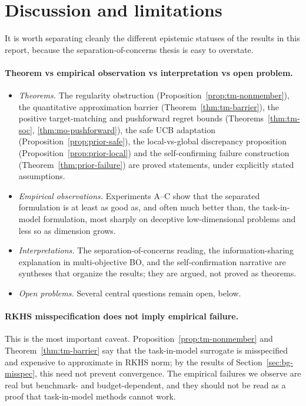 \FloatBarrier
\section{Discussion and limitations}
\label{sec:discussion}

It is worth separating cleanly the different epistemic statuses of the results in
this report, because the separation-of-concerns thesis is easy to overstate.

\paragraph{Theorem vs empirical observation vs interpretation vs open problem.}
\begin{itemize}
  \item \emph{Theorems.} The regularity obstruction
        (Proposition~\ref{prop:tm-nonmember}), the quantitative approximation
        barrier (Theorem~\ref{thm:tm-barrier}), the positive target-matching and
        pushforward regret bounds (Theorems~\ref{thm:tm-soc},
        \ref{thm:mo-pushforward}), the safe UCB adaptation
        (Proposition~\ref{prop:prior-safe}), the local-vs-global discrepancy
        proposition (Proposition~\ref{prop:prior-local}) and the self-confirming
        failure construction (Theorem~\ref{thm:prior-failure}) are proved
        statements, under explicitly stated assumptions.
  \item \emph{Empirical observations.} Experiments A--C show that the separated
        formulation is at least as good as, and often much better than, the
        task-in-model formulation, most sharply on deceptive low-dimensional
        problems and less so as dimension grows.
  \item \emph{Interpretations.} The separation-of-concerns reading, the
        information-sharing explanation in multi-objective BO, and the
        self-confirmation narrative are syntheses that organize the results; they
        are argued, not proved as theorems.
  \item \emph{Open problems.} Several central questions remain open, below.
\end{itemize}

\paragraph{RKHS misspecification does not imply empirical failure.}
This is the most important caveat. Proposition~\ref{prop:tm-nonmember} and
Theorem~\ref{thm:tm-barrier} say that the task-in-model surrogate is misspecified
and expensive to approximate in RKHS norm; by the results of
Section~\ref{sec:bg-misspec}, this need not prevent convergence. The empirical
failures we observe are real but benchmark- and budget-dependent, and they should
not be read as a proof that task-in-model methods cannot work.


